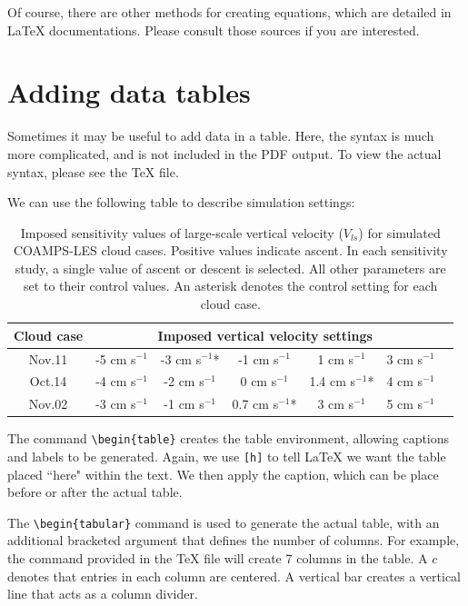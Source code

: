 \documentclass[master]{UWMThesis}
\begin{document}
Of course, there are other methods for creating equations, which are detailed in LaTeX documentations.  Please consult those sources if you are interested.


\chapter{Adding data tables} \label{sec:data_tables}
Sometimes it may be useful to add data in a table.  Here, the syntax is much more complicated, and is not included in the PDF output.  To view the actual syntax, please see the TeX file.

We can use the following table to describe simulation settings:

\begin{table}[h]
\centering
\caption{Imposed sensitivity values of large-scale vertical velocity ($V_{ls}$) for simulated COAMPS-LES cloud cases.  Positive values indicate ascent.  In each sensitivity study, a single value of ascent or descent is selected.  All other parameters are set to their control values.  An asterisk denotes the control setting for each cloud case.}
\vspace{0.5pc}
\begin{tabular}{c|cccccc}
\hline
Cloud case & \multicolumn{5}{c}{Imposed vertical velocity settings} \\
\hline
Nov.11 & -5 cm s$^{-1}$ & -3 cm s$^{-1}$* & -1 cm s$^{-1}$ &   1 cm s$^{-1}$  & 3 cm s$^{-1}$ \\
Oct.14 & -4 cm s$^{-1}$ & -2 cm s$^{-1}$  &  0 cm s$^{-1}$ & 1.4 cm s$^{-1}$* & 4 cm s$^{-1}$ \\
Nov.02 & -3 cm s$^{-1}$ & -1 cm s$^{-1}$  &0.7 cm s$^{-1}$*&   3 cm s$^{-1}$  & 5 cm s$^{-1}$ \\
\hline
\end{tabular}

\label{tab:vel_ls_sens_list}
\end{table}

The command \verb=\begin{table}= creates the table environment, allowing captions and labels to be generated.  Again, we use \verb=[h]= to tell LaTeX we want the table placed ``here" within the text.  We then apply the caption, which can be place before or after the actual table. 

The \verb=\begin{tabular}= command is used to generate the actual table, with an additional bracketed argument that defines the number of columns.  For example, the command provided in the TeX file will create 7 columns in the table.  A $c$ denotes that entries in each column are centered.  A vertical bar creates a vertical line that acts as a column divider.
\end{document}
